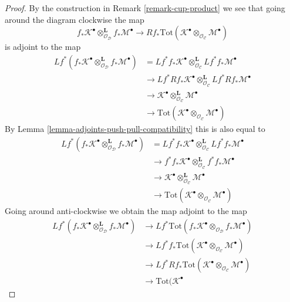 \begin{proof}
By the construction in Remark \ref{remark-cup-product} we see that
going around the diagram clockwise the map
$$
f_*\mathcal{K}^\bullet
\otimes_{\mathcal{O}_\mathcal{D}}^\mathbf{L}
f_*\mathcal{M}^\bullet 
\longrightarrow
Rf_*\text{Tot}(\mathcal{K}^\bullet
\otimes_{\mathcal{O}_\mathcal{C}}
\mathcal{M}^\bullet)
$$
is adjoint to the map
\begin{align*}
Lf^*(f_*\mathcal{K}^\bullet
\otimes_{\mathcal{O}_\mathcal{D}}^\mathbf{L}
f_*\mathcal{M}^\bullet)
& =
Lf^*f_*\mathcal{K}^\bullet
\otimes_{\mathcal{O}_\mathcal{C}}^\mathbf{L}
Lf^*f_*\mathcal{M}^\bullet \\
& \to
Lf^*Rf_*\mathcal{K}^\bullet
\otimes_{\mathcal{O}_\mathcal{C}}^\mathbf{L}
Lf^*Rf_*\mathcal{M}^\bullet \\
& \to
\mathcal{K}^\bullet
\otimes_{\mathcal{O}_\mathcal{C}}^\mathbf{L}
\mathcal{M}^\bullet \\
& \to
\text{Tot}(\mathcal{K}^\bullet
\otimes_{\mathcal{O}_\mathcal{C}}
\mathcal{M}^\bullet)
\end{align*}
By Lemma \ref{lemma-adjoints-push-pull-compatibility} this is also equal to
\begin{align*}
Lf^*(f_*\mathcal{K}^\bullet
\otimes_{\mathcal{O}_\mathcal{D}}^\mathbf{L}
f_*\mathcal{M}^\bullet)
& =
Lf^*f_*\mathcal{K}^\bullet
\otimes_{\mathcal{O}_\mathcal{C}}^\mathbf{L}
Lf^*f_*\mathcal{M}^\bullet \\
& \to
f^*f_*\mathcal{K}^\bullet
\otimes_{\mathcal{O}_\mathcal{C}}^\mathbf{L}
f^*f_*\mathcal{M}^\bullet \\
& \to
\mathcal{K}^\bullet
\otimes_{\mathcal{O}_\mathcal{C}}^\mathbf{L}
\mathcal{M}^\bullet \\
& \to
\text{Tot}(\mathcal{K}^\bullet
\otimes_{\mathcal{O}_\mathcal{C}}
\mathcal{M}^\bullet)
\end{align*}
Going around anti-clockwise we obtain the map adjoint to the map
\begin{align*}
Lf^*(f_*\mathcal{K}^\bullet
\otimes_{\mathcal{O}_\mathcal{D}}^\mathbf{L}
f_*\mathcal{M}^\bullet)
& \to
Lf^*\text{Tot}(
f_*\mathcal{K}^\bullet
\otimes_{\mathcal{O}_\mathcal{D}}
f_*\mathcal{M}^\bullet) \\
& \to
Lf^*f_*\text{Tot}(\mathcal{K}^\bullet
\otimes_{\mathcal{O}_\mathcal{C}}
\mathcal{M}^\bullet) \\
& \to
Lf^*Rf_*\text{Tot}(\mathcal{K}^\bullet
\otimes_{\mathcal{O}_\mathcal{C}}
\mathcal{M}^\bullet) \\
& \to
\text{Tot}(\mathcal{K}^\bullet

\end{align*}
\end{proof}
